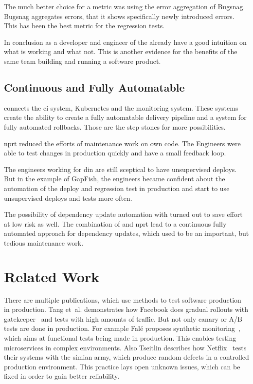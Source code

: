 The much better choice for a metric was using the error aggregation of Bugsnag. Bugsnag
aggregates errors, that it shows specifically newly introduced errors. This has been the
best metric for the regression tests.


In conclusion as a developer and engineer of the already have a good intuition on what is
working and what not. This is another evidence for the benefits of the same team building
and running a software product.

\subsection{Continuous and Fully Automatable}

\deployer connects the \gls{ci} system, Kubernetes and the monitoring system. These systems
create the ability to create a fully automatable delivery pipeline and a system for fully
automated rollbacks. Those are the step stones for more possibilities.

\gls{nprt} reduced the efforts of maintenance work on own code. The Engineers were able to
test changes in production quickly and have a small feedback loop.

The engineers working for \gls{din} are still sceptical to have unsupervised deploys. But
in the example of GapFish, the engineers became confident about the automation of the
deploy and regression test in production and start to use unsupervised deploys and tests
more often.

The possibility of dependency update automation with \gemupdater turned out to save effort
at low risk as well. The combination of \gemupdater and \gls{nprt} lead to a continuous
fully automated approach for dependency updates, which used to be an important, but
tedious maintenance work.

\section{Related Work}

There are multiple publications, which use methods to test software production in
production. Tang et~al. demonstrates how Facebook does gradual rollouts with
gatekeeper~\cite{fb_config_management} and tests with high amounts of traffic. But not
only canary or A/B tests are done in production. For example Falé proposes synthetic
monitoring~\cite{synthmonitoring}, which aims at functional tests being made in
production. This enables testing microservices in complex environments. Also Tseitlin
describes how Netflix~\cite{antifragile_org} tests their systems with the simian army,
which produce random defects in a controlled production environment. This practice lays
open unknown issues, which can be fixed in order to gain better reliability.

